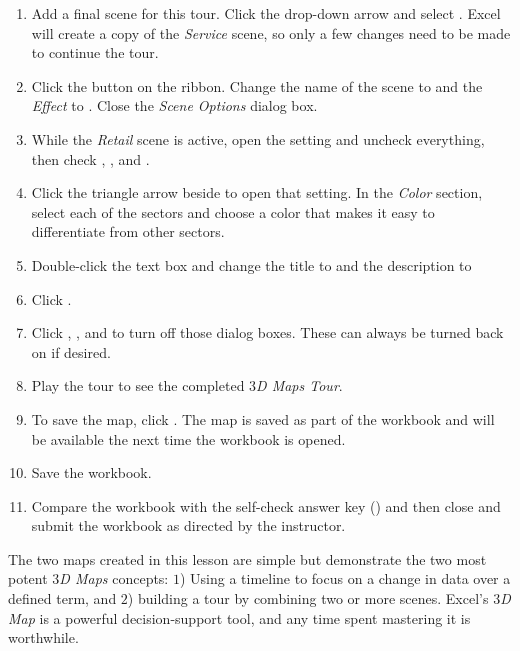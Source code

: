 \begin{enumbox}
\begin{enumerate}
		\item Add a final scene for this tour. Click the  drop-down arrow and select . Excel will create a copy of the \textit{Service} scene, so only a few changes need to be made to continue the tour.
		\item Click the  button on the ribbon. Change the name of the scene to  and the \textit{Effect} to . Close the \textit{Scene Options} dialog box.
		\item While the \textit{Retail} scene is active, open the  setting and uncheck everything, then check , , and .
		\item Click the triangle arrow beside  to open that setting. In the \textit{Color} section, select each of the sectors and choose a color that makes it easy to differentiate from other sectors.
		\item Double-click the text box and change the title to  and the description to 
		\item Click .
		
		\item Click , , and  to turn off those dialog boxes. These can always be turned back on if desired.
		\item Play the tour to see the completed \textit{$ 3 $D Maps Tour}.
		\item To save the map, click . The map is saved as part of the workbook and will be available the next time the workbook is opened.
	
		\item Save the  workbook.
		\item Compare the workbook with the self-check answer key () and then close and submit the  workbook as directed by the instructor.
		
	\end{enumerate}
\end{enumbox}

The two maps created in this lesson are simple but demonstrate the two most potent \textit{$ 3 $D Maps} concepts: $ 1 $) Using a timeline to focus on a change in data over a defined term, and $ 2 $) building a tour by combining two or more scenes. Excel's \textit{$ 3 $D Map} is a powerful decision-support tool, and any time spent mastering it is worthwhile.

